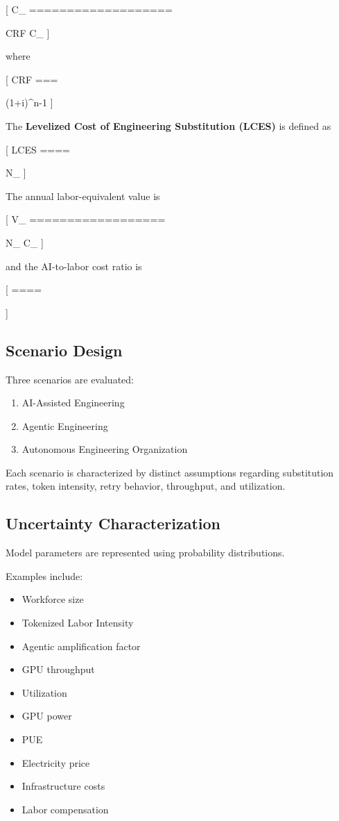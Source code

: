 [
C_{}
===================

CRF
\cdot
C_{}
]

where

[
CRF
===

{(1+i)^n-1}
]

The \textbf{Levelized Cost of Engineering Substitution (LCES)} is defined as

[
LCES
====

{
N_{}
}
]

The annual labor-equivalent value is

[
V_{}
==================

N_{}
\cdot
C_{}
]

and the AI-to-labor cost ratio is

[
\rho
====

]

\subsection{Scenario Design}

Three scenarios are evaluated:

\begin{enumerate}
\item AI-Assisted Engineering
\item Agentic Engineering
\item Autonomous Engineering Organization
\end{enumerate}

Each scenario is characterized by distinct assumptions regarding substitution rates, token intensity, retry behavior, throughput, and utilization.

\subsection{Uncertainty Characterization}

Model parameters are represented using probability distributions.

Examples include:

\begin{itemize}
\item Workforce size
\item Tokenized Labor Intensity
\item Agentic amplification factor
\item GPU throughput
\item Utilization
\item GPU power
\item PUE
\item Electricity price
\item Infrastructure costs
\item Labor compensation
\end{itemize}

